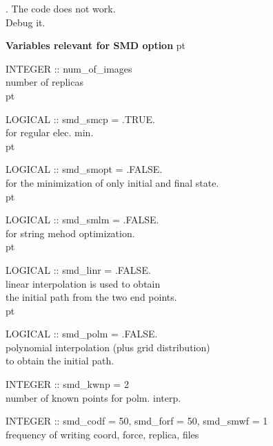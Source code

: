 \documentclass[aps,prb,preprint,groupedaddress]{revtex4}
\begin{document}
. The code does not work. \\
\vskip 7pt
\noindent
Debug it.


\newpage
\noindent
{\large \bf Variables relevant for SMD option}
 pt

INTEGER :: num\_of\_images \\
\- \hspace{40pt} number of replicas \\  pt
 
LOGICAL :: smd\_smcp = .TRUE. \\
\- \hspace{40pt} for regular elec. min. \\  pt

LOGICAL :: smd\_smopt = .FALSE. \\
\- \hspace{40pt} for the minimization of only initial and final state. \\  pt

LOGICAL :: smd\_smlm = .FALSE. \\
\- \hspace{40pt} for string mehod optimization. \\  pt  


LOGICAL :: smd\_linr = .FALSE. \\
\- \hspace{40pt} linear interpolation is used to obtain  \\
\- \hspace{40pt} the initial path from the two end points. \\  pt

LOGICAL :: smd\_polm = .FALSE. \\
\- \hspace{40pt} polynomial interpolation (plus grid distribution) \\
\- \hspace{40pt} to obtain the initial path. \\ \vskip 10pt

INTEGER :: smd\_kwnp = 2 \\
\- \hspace{40pt} number of known points for polm. interp. \\ \vskip 10pt

INTEGER :: smd\_codf = 50, smd\_forf = 50, smd\_smwf = 1 \\
\- \hspace{40pt} frequency of writing coord, force, replica, files \\ \vskip 20pt
\end{document}
